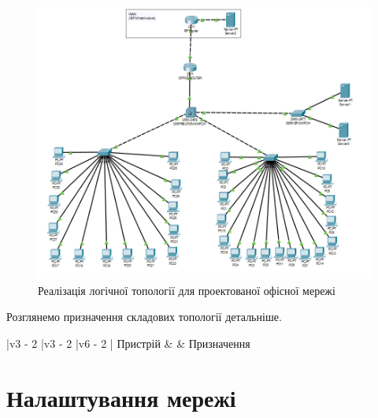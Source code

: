 \documentclass[
  ukrainian,
  simple,
]{eskdnaukvd}
\newlength{\gridunitwidth}
\begin{document}
      \begin{figure}[!htbp]
        \centering
        \includegraphics[width = \columnwidth]{./assets/05-net-topology-logical.png}
        \caption{Реалізація логічної топології для проектованої офісної мережі}
        \label{fig:net-topology-logical}
      \end{figure}

      Розглянемо призначення складових топології детальніше.

      \begin{table}[!htbp]
        \centering
        \caption{}
        \label{}
        \begin{tabular}{
          |v{3 \gridunitwidth - 2 \tabcolsep}
          |v{3 \gridunitwidth - 2 \tabcolsep}
          |v{6 \gridunitwidth - 2 \tabcolsep}
          |
        }
          \hline
            Пристрій & \textenglish{} & Призначення \\
          \hline
          \hline
        \end{tabular}
      \end{table}

  \section{Налаштування мережі}
\end{document}

